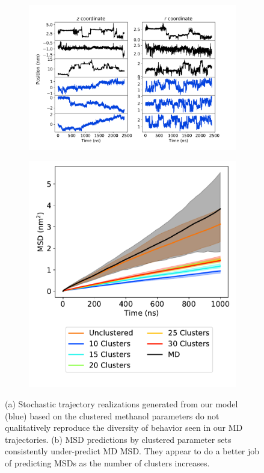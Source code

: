 \documentclass[journal=jpcbfk,manuscript=article]{achemso}
\begin{document}
  \begin{figure}
  \centering
  \begin{subfigure}{0.63\textwidth}
  \includegraphics[width=\textwidth]{qualitative_clustered_MET_10.pdf}
  \caption{}\label{fig:qualitative_clustered_MET}
  \end{subfigure}
  \begin{subfigure}{0.35\textwidth}
  \vspace{2.25em}
  \includegraphics[width=\textwidth]{msd_nclusters.pdf}
  \caption{}\label{fig:clustered_MSD}
  \end{subfigure}
  \caption{(a) Stochastic trajectory realizations generated from our model (blue) based on
  the clustered methanol parameters do not qualitatively reproduce the diversity of behavior
  seen in our MD trajectories. (b) MSD predictions by clustered parameter sets consistently
  under-predict MD MSD. They appear to do a better job of predicting MSDs as the number
  of clusters increases.}\label{fig:clustered_dynamics}
  \end{figure}
  
\end{document}
